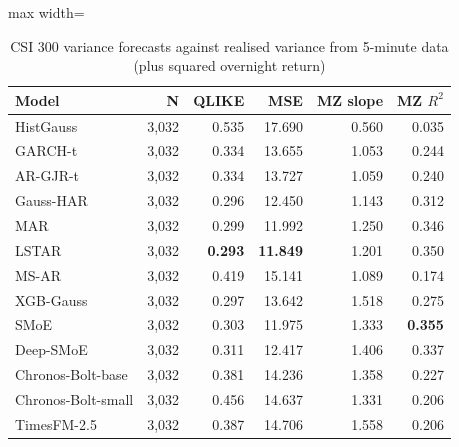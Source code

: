\begin{table}[!htbp]\centering\small
\caption{CSI 300 variance forecasts against realised variance from 5-minute data (plus squared overnight return)}\label{tab:rv}
\begin{adjustbox}{max width=\textwidth}
\begin{tabular}{lrrrrr}
\toprule
Model & N & QLIKE & MSE & MZ slope & MZ $R^2$\\
\midrule
HistGauss & 3,032 & 0.535 & 17.690 & 0.560 & 0.035\\
GARCH-t & 3,032 & 0.334 & 13.655 & 1.053 & 0.244\\
AR-GJR-t & 3,032 & 0.334 & 13.727 & 1.059 & 0.240\\
Gauss-HAR & 3,032 & 0.296 & 12.450 & 1.143 & 0.312\\
MAR & 3,032 & 0.299 & 11.992 & 1.250 & 0.346\\
LSTAR & 3,032 & \textbf{0.293} & \textbf{11.849} & 1.201 & 0.350\\
MS-AR & 3,032 & 0.419 & 15.141 & 1.089 & 0.174\\
XGB-Gauss & 3,032 & 0.297 & 13.642 & 1.518 & 0.275\\
SMoE & 3,032 & 0.303 & 11.975 & 1.333 & \textbf{0.355}\\
Deep-SMoE & 3,032 & 0.311 & 12.417 & 1.406 & 0.337\\
Chronos-Bolt-base & 3,032 & 0.381 & 14.236 & 1.358 & 0.227\\
Chronos-Bolt-small & 3,032 & 0.456 & 14.637 & 1.331 & 0.206\\
TimesFM-2.5 & 3,032 & 0.387 & 14.706 & 1.558 & 0.206\\
\bottomrule
\end{tabular}
\end{adjustbox}
\end{table}